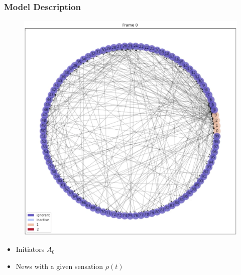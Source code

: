 \documentclass{beamer}
\begin{document}
\begin{frame}
\frametitle{Model Description}

\begin{center}
\begin{figure}
\includegraphics[scale=0.2]{images/frame0.png}
\end{figure}
\end{center}

\begin{itemize}
\item<1-> Initiators $A_0$
\item<2-> News with a given sensation $\rho(t)$
\end{itemize}

\end{frame}
\end{document}
